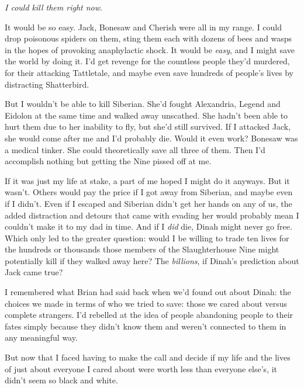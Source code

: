 





\emph{I could kill them right now}.



It would be so easy.  Jack, Bonesaw and Cherish were all in my range.  I could drop poisonous spiders on them, sting them each with dozens of bees and wasps in the hopes of provoking anaphylactic shock.  It would be \emph{easy}, and I might save the world by doing it.  I'd get revenge for the countless people they'd murdered, for their attacking Tattletale, and maybe even save hundreds of people's lives by distracting Shatterbird.



But I wouldn't be able to kill Siberian.  She'd fought Alexandria, Legend and Eidolon at the same time and walked away unscathed.  She hadn't been able to hurt them due to her inability to fly, but she'd still survived.  If I attacked Jack, she would come after me and I'd probably die.  Would it even work?  Bonesaw was a medical tinker.  She could theoretically save all three of them.  Then I'd accomplish nothing but getting the Nine pissed off at me.



If it was just my life at stake, a part of me hoped I might do it anyways. But it wasn't.  Others would pay the price if I got away from Siberian, and maybe even if I didn't.  Even if I escaped and Siberian didn't get her hands on any of us, the added distraction and detours that came with evading her would probably mean I couldn't make it to my dad in time.  And if I \emph{did} die, Dinah might never go free.  Which only led to the greater question: would I be willing to trade ten lives for the hundreds or thousands those members of the Slaughterhouse Nine might potentially kill if they walked away here?  The \emph{billions}, if Dinah's prediction about Jack came true?



I remembered what Brian had said back when we'd found out about Dinah: the choices we made in terms of who we tried to save: those we cared about versus complete strangers.  I'd rebelled at the idea of people abandoning people to their fates simply because they didn't know them and weren't connected to them in any meaningful way.



But now that I faced having to make the call and decide if my life and the lives of just about everyone I cared about were worth less than everyone else's, it didn't seem so black and white.



